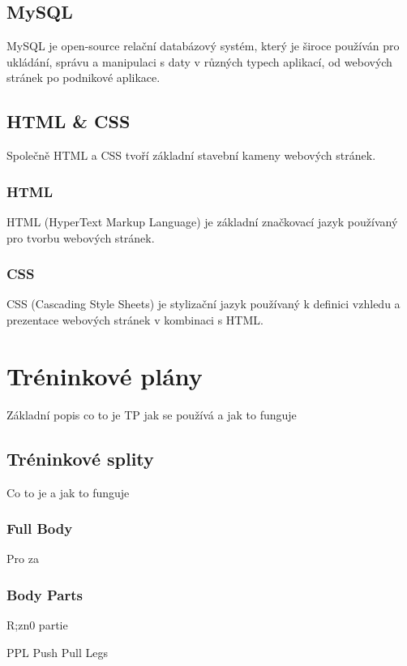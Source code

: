 \documentclass[
  field=inf,
  biblatex,
  glossaries,
  index
]{kidiplom}
\begin{document}
\subsection{MySQL}

MySQL je open-source relační databázový systém, který je široce používán pro ukládání, správu a manipulaci s daty v různých typech aplikací, od webových stránek po podnikové aplikace.

\subsection{HTML \& CSS}
Společně HTML a CSS tvoří základní stavební kameny webových stránek.

\subsubsection{HTML}

HTML (HyperText Markup Language) je základní značkovací jazyk používaný pro tvorbu webových stránek.

\subsubsection{CSS}

CSS (Cascading Style Sheets) je stylizační jazyk používaný k definici vzhledu a prezentace webových stránek v kombinaci s HTML. 

\section{Tréninkové plány}
Základní popis co to je \gls{TP} jak se používá a jak to funguje

\subsection{Tréninkové splity}
Co to je a jak to funguje

\subsubsection{Full Body}
Pro za

\subsubsection{Body Parts}
R;zn0 partie

 {PPL} {Push Pull Legs} 
\end{document}
